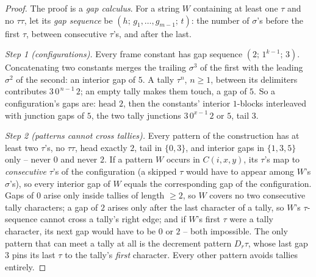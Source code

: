 \begin{proof}
    The proof is a \emph{gap calculus}. For a string $W$ containing at
    least one $\tau$ and no $\tau\tau$, let its \emph{gap sequence} be
    $(h;\, g_1, \dots, g_{m-1};\, t)$: the number of $\sigma$'s before
    the first $\tau$, between consecutive $\tau$'s, and after the last.

    \emph{Step 1 (configurations).} Every frame constant has gap
    sequence $(2;\, 1^{k-1};\, 3)$. Concatenating two constants merges
    the trailing $\sigma^3$ of the first with the leading $\sigma^2$ of
    the second: an interior gap of $5$. A tally $\tau^{n}$, $n \geq 1$,
    between its delimiters contributes $3\,0^{\,n-1}\,2$; an empty tally
    makes them touch, a gap of $5$. So a configuration's gaps are: head
    $2$, then the constants' interior $1$-blocks interleaved with
    junction gaps of $5$, the two tally junctions $3\,0^{x-1}\,2$ or
    $5$, tail $3$.

    \emph{Step 2 (patterns cannot cross tallies).} Every pattern of
    the construction has at least two $\tau$'s, no $\tau\tau$, head
    exactly $2$, tail in $\{0, 3\}$, and interior gaps in $\{1, 3, 5\}$
    only -- never $0$ and never $2$. If a pattern $W$ occurs in
    $C(i,x,y)$, its $\tau$'s map to \emph{consecutive} $\tau$'s of the
    configuration (a skipped $\tau$ would have to appear among $W$'s
    $\sigma$'s), so every interior gap of $W$ equals the corresponding
    gap of the configuration. Gaps of $0$ arise only inside tallies of
    length $\geq 2$, so $W$ covers no two consecutive tally characters;
    a gap of $2$ arises only after the last character of a tally, so
    $W$'s $\tau$-sequence cannot cross a tally's right edge; and if
    $W$'s first $\tau$ were a tally character, its next gap would have
    to be $0$ or $2$ -- both impossible. The only pattern that can meet
    a tally at all is the decrement pattern $D_r\tau$, whose last gap
    $3$ pins its last $\tau$ to the tally's \emph{first} character.
    Every other pattern avoids tallies entirely.


\end{proof}
